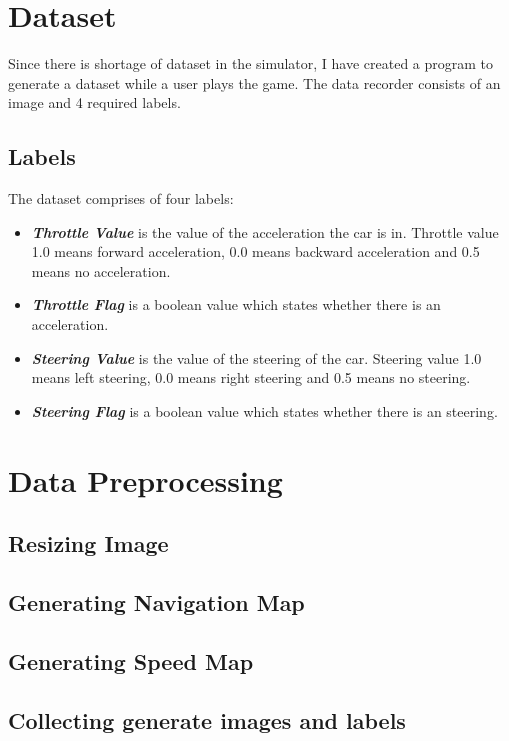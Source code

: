 \section{Dataset}
Since there is shortage of dataset in the simulator, I have created a program to generate a dataset while a user plays the game. The data recorder consists of an image and 4 required labels. 

\subsection{Labels}
The dataset comprises of four labels:
\begin{itemize}
    \item \textbf{\textit{Throttle Value}} is the value of the acceleration the car is in. Throttle value 1.0 means forward acceleration, 0.0 means backward acceleration and 0.5 means no acceleration.
    \item \textbf{\textit{Throttle Flag}} is a boolean value which states whether there is an acceleration.
    \item \textbf{\textit{Steering Value}} is the value of the steering of the car. Steering value 1.0 means left steering, 0.0 means right steering and 0.5 means no steering.
    \item \textbf{\textit{Steering Flag}} is a boolean value which states whether there is an steering.
\end{itemize}

\section{Data Preprocessing}

\subsection{Resizing Image}

\subsection{Generating Navigation Map}

\subsection{Generating Speed Map}

\subsection{Collecting generate images and labels}


